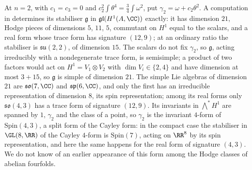 \begin{remark}[The exceptional ratio at $n=2$]\label{rem:p2primeexceptional}
At $n=2$, with $c_{1}=c_{3}=0$ and $c_{2}^{2}\int\theta^{4}=\frac34\int\omega^{2}$,
put $\gamma_{2}=\omega+c_{2}\theta^{2}$. A computation in \cite{BMB26} determines its stabiliser $\mathfrak{g}$ in
$\mathfrak{gl}(H^{1}(A,\CC))$ exactly: it has dimension $21$, Hodge pieces of
dimensions $5$, $11$, $5$, commutant on $H^{1}$ equal to the scalars, and a
real form whose trace form has signature $(12,9)$; at an ordinary ratio the
stabiliser is $\mathfrak{su}(2,2)$, of dimension $15$. The scalars do not fix
$\gamma_{2}$, so $\mathfrak{g}$, acting irreducibly with a nondegenerate trace
form, is semisimple; a product of two factors would act on
$H^{1}=V_{1}\otimes V_{2}$ with $\dim V_{i}\in\{2,4\}$ and have dimension at
most $3+15$, so $\mathfrak{g}$ is simple of dimension $21$. The simple Lie
algebras of dimension $21$ are $\mathfrak{so}(7,\CC)$ and
$\mathfrak{sp}(6,\CC)$, and only the first has an irreducible representation
of dimension $8$, its spin representation; among its real forms only
$\mathfrak{so}(4,3)$ has a trace form of signature $(12,9)$. Its invariants in
$\bigwedge^{*}H^{1}$ are spanned by $1$, $\gamma_{2}$ and the class of a point,
so $\gamma_{2}$ is the invariant $4$-form of $\mathrm{Spin}(4,3)$, a split form
of the Cayley form: in the compact case the stabiliser in $\GL(8,\RR)$ of the
Cayley $4$-form is $\mathrm{Spin}(7)$, acting on $\RR^{8}$ by its spin
representation, and here the same happens for the real form of signature
$(4,3)$. We do not know of an earlier appearance of this form among the
Hodge classes of abelian fourfolds.


\end{remark}
